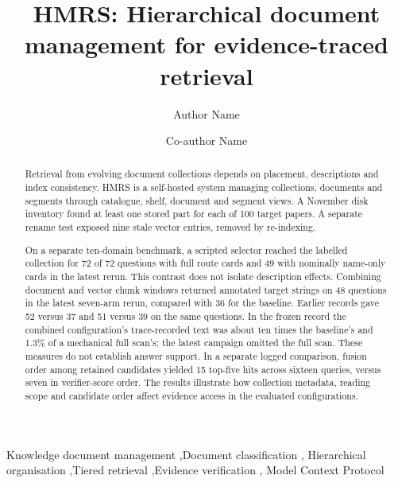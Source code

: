 \documentclass[review,12pt]{elsarticle}
\begin{document}
\begin{frontmatter}

\title{HMRS: Hierarchical document management for evidence-traced retrieval}

\author[inst1]{Author Name}
\author[inst1]{Co-author Name}

\begin{abstract}
Retrieval from evolving document collections depends on placement,
descriptions and index consistency. HMRS is a self-hosted system managing
collections, documents and segments through catalogue, shelf, document and
segment views. A November disk inventory found at least one stored part for
each of 100 target papers. A separate rename test exposed nine stale vector
entries, removed by re-indexing.

On a separate ten-domain benchmark, a scripted selector reached the
labelled collection for 72 of 72 questions with full route cards and 49
with nominally name-only cards in the latest rerun. This contrast does not
isolate description effects. Combining document and vector chunk windows
returned annotated target strings
on 48 questions in the latest seven-arm rerun, compared with 36 for the
baseline. Earlier records gave 52 versus 37 and 51 versus 39 on the same
questions. In the frozen record the combined configuration's trace-recorded
text was about ten times the baseline's and 1.3\% of a mechanical full scan's;
the latest campaign omitted the full scan. These measures do not establish
answer support. In a separate logged comparison, fusion order among retained
candidates yielded 15 top-five hits across sixteen queries, versus seven in
verifier-score order. The results illustrate how collection metadata, reading scope and candidate order
affect evidence access in the evaluated configurations.
\end{abstract}

\begin{keyword}
Knowledge document management \sep Document classification \sep
Hierarchical organisation \sep Tiered retrieval \sep Evidence verification \sep
Model Context Protocol
\end{keyword}

\end{frontmatter}
















{\ifdefined\HMRSReviewLayout\else\footnotesize\fi
\setlength{\bibsep}{0.5pt plus 0.2ex}


}
\end{document}
